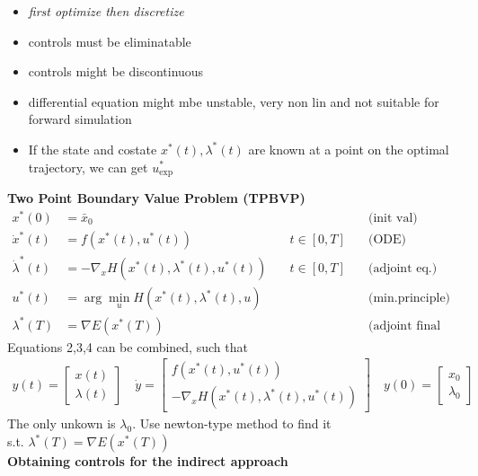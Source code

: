 
\begin{tcolorbox}[colback=gray!5!white,colframe=gray!75!black,title=\textbf{Indirect Approach}]
\begin{itemize}
	\item \textit{first optimize then discretize}
	\item controls must be eliminatable
	\item controls might be discontinuous
	\item differential equation might mbe unstable, very non lin and not suitable
    for forward simulation
  \item If the state and costate $x^*(t),\lambda^*(t)$ are known at a point on
    the optimal trajectory, we can get $u^*_{\mathrm{exp}}$ \\
\end{itemize}
\textbf{Two Point Boundary Value Problem (TPBVP)}
\begin{align*}
	x^*(0) &= \bar{x}_0 & & \text{(init val)}\\
	\dot{x}^*(t) &= f(x^*(t), u^*(t)) \quad &t \in [0, T] \quad & \text{(ODE)}\\
	\dot{\lambda}^*(t) &= - \nabla_x H(x^*(t), \lambda^*(t), u^*(t)) \quad & t \in [0, T] \quad & \text{(adjoint eq.)}\\
	u^*(t) &= \arg \min_u H(x^*(t), \lambda^*(t), u) & & \text{(min.principle)}\\
	\lambda^*(T) &= \nabla E(x^*(T)) & & \text{(adjoint final val)}
\end{align*}
Equations 2,3,4 can be combined, such that
\begin{align*}
	y(t) = \begin{bmatrix}
	x(t) \\ \lambda(t)
	\end{bmatrix}
	 \quad
	 \dot{y} =
	 \begin{bmatrix}
		 f(x^*(t), u^*(t))\\
		 - \nabla_x H(x^*(t), \lambda^*(t), u^*(t))
	 \end{bmatrix}
 	\quad
 	y(0) = \begin{bmatrix}
		x_0\\ \lambda_0
 	\end{bmatrix}
\end{align*}
The only unkown is $\lambda_0$. Use newton-type method to find it\\s.t.
$\lambda^*(T) = \nabla E(x^*(T)) $\\
\textbf{Obtaining controls for the indirect approach}\\

\end{tcolorbox}
